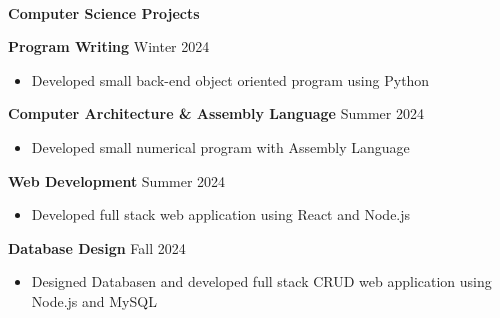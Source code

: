 \begin{flushleft}
    \hrulefill \\
    \begin{large}
        \textbf{Computer Science Projects} \\
    \end{large} 
\end{flushleft}
\textbf{Program Writing} \hfill Winter 2024
\begin{itemize}
    \item Developed small back-end object oriented program using Python
\end{itemize}
\textbf{Computer Architecture \& Assembly Language} \hfill Summer 2024
\begin{itemize}
    \item Developed small numerical program with Assembly Language
\end{itemize}
\textbf{Web Development} \hfill Summer 2024
\begin{itemize}
    \item Developed full stack web application using React and Node.js
\end{itemize}
\textbf{Database Design} \hfill Fall 2024
\begin{itemize}
    \item Designed Databasen and developed full stack CRUD web application using Node.js and MySQL
\end{itemize}